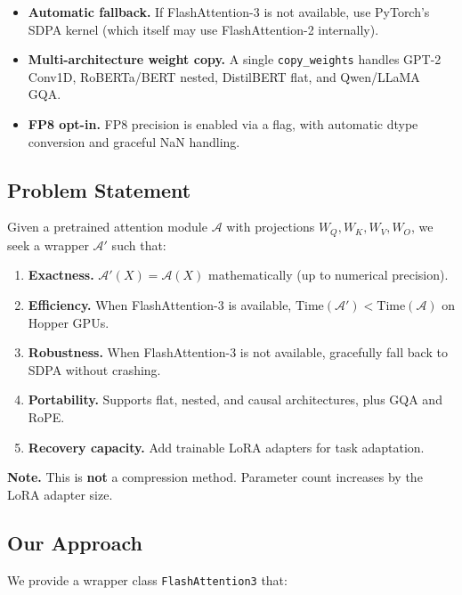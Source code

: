 \begin{itemize}
\item \textbf{Automatic fallback.} If FlashAttention-3 is not available, use
  PyTorch's SDPA kernel (which itself may use FlashAttention-2 internally).
\item \textbf{Multi-architecture weight copy.} A single \texttt{copy\_weights} handles
  GPT-2 Conv1D, RoBERTa/BERT nested, DistilBERT flat, and Qwen/LLaMA GQA.
\item \textbf{FP8 opt-in.} FP8 precision is enabled via a flag, with automatic
  dtype conversion and graceful NaN handling.

\end{itemize}
\subsection{Problem Statement}

Given a pretrained attention module $\mathcal{A}$ with projections 
$W_Q, W_K, W_V, W_O$, we seek a wrapper $\mathcal{A}'$ such that:

\begin{enumerate}
\item \textbf{Exactness.} $\mathcal{A}'(X) = \mathcal{A}(X)$ mathematically (up to
  numerical precision).
\item \textbf{Efficiency.} When FlashAttention-3 is available,
  $\text{Time}(\mathcal{A}') < \text{Time}(\mathcal{A})$ on Hopper GPUs.
\item \textbf{Robustness.} When FlashAttention-3 is not available, gracefully fall
  back to SDPA without crashing.
\item \textbf{Portability.} Supports flat, nested, and causal architectures, plus
  GQA and RoPE.
\item \textbf{Recovery capacity.} Add trainable LoRA adapters for task adaptation.

\end{enumerate}
\textbf{Note.} This is \textbf{not} a compression method. Parameter count increases 
by the LoRA adapter size.

\subsection{Our Approach}

We provide a wrapper class \texttt{FlashAttention3} that:

